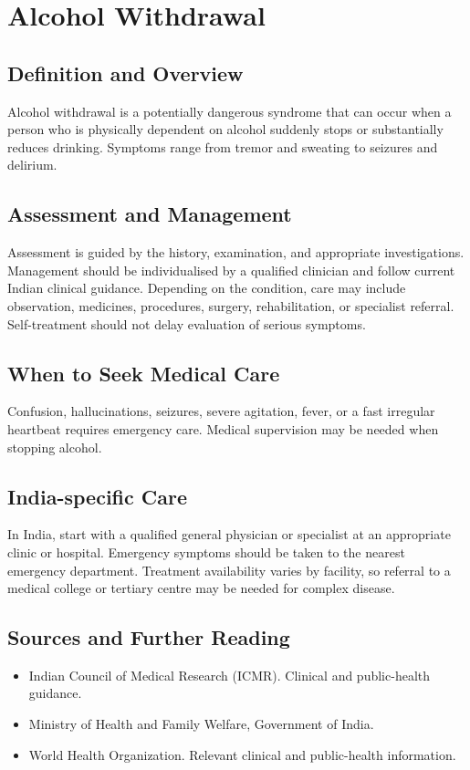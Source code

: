 \chapter{Alcohol Withdrawal}

\section*{Definition and Overview}
Alcohol withdrawal is a potentially dangerous syndrome that can occur when a person who is physically dependent on alcohol suddenly stops or substantially reduces drinking. Symptoms range from tremor and sweating to seizures and delirium.

\section*{Assessment and Management}
Assessment is guided by the history, examination, and appropriate investigations. Management should be individualised by a qualified clinician and follow current Indian clinical guidance. Depending on the condition, care may include observation, medicines, procedures, surgery, rehabilitation, or specialist referral. Self-treatment should not delay evaluation of serious symptoms.

\section*{When to Seek Medical Care}
Confusion, hallucinations, seizures, severe agitation, fever, or a fast irregular heartbeat requires emergency care. Medical supervision may be needed when stopping alcohol.

\section*{India-specific Care}
In India, start with a qualified general physician or specialist at an appropriate clinic or hospital. Emergency symptoms should be taken to the nearest emergency department. Treatment availability varies by facility, so referral to a medical college or tertiary centre may be needed for complex disease.

\section*{Sources and Further Reading}
\begin{itemize}
    \item Indian Council of Medical Research (ICMR). Clinical and public-health guidance.
    \item Ministry of Health and Family Welfare, Government of India.
    \item World Health Organization. Relevant clinical and public-health information.
\end{itemize}

